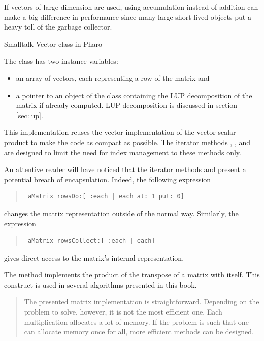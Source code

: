 If vectors of large dimension are used, using accumulation instead
of addition can make a big difference in performance since many
large short-lived objects put a heavy toll of the garbage
collector.

\begin{listing}[label=ls:vector]{Smalltalk}
{Vector class in Pharo}
%
\end{listing}

\noindent The class  has two instance variables:
\begin{itemize}
\item {} an array of vectors, each representing a
row of the matrix and
\item {} a pointer to an object of the class  containing the LUP decomposition of the matrix if already computed.
LUP decomposition is discussed in
section \ref{sec:lup}.
\end{itemize}
This implementation reuses the vector implementation of the vector
scalar product to make the code as compact as possible.
The iterator methods , ,  and  are designed to limit the need for index management to these methods only.

An attentive reader will have noticed that the iterator methods
 and  present a potential breach of
encapsulation. Indeed, the following expression
\begin{quote}
\begin{verbatim}
 aMatrix rowsDo:[ :each | each at: 1 put: 0]
\end{verbatim}
\end{quote}
changes the matrix representation outside of the normal way.
Similarly, the expression
\begin{quote}
\begin{verbatim}
 aMatrix rowsCollect:[ :each | each]
\end{verbatim}
\end{quote}
gives direct access to the matrix's internal representation.

The method  implements the product of the transpose of
a matrix with itself. This construct is used in several algorithms
presented in this book.

\begin{quotation}
 The presented matrix implementation is
straightforward. Depending on the problem to solve, however, it is
not the most efficient one. Each multiplication allocates a lot of
memory. If the problem is such that one can allocate memory once
for all, more efficient methods can be designed.
\end{quotation}

